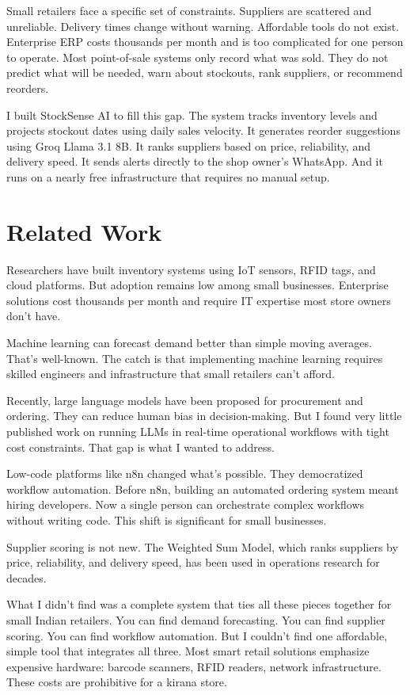 \documentclass[journal]{IEEEtran}
\begin{document}
Small retailers face a specific set of constraints. Suppliers are scattered and unreliable. Delivery times change without warning. Affordable tools do not exist. Enterprise ERP costs thousands per month and is too complicated for one person to operate. Most point-of-sale systems only record what was sold. They do not predict what will be needed, warn about stockouts, rank suppliers, or recommend reorders.

I built StockSense AI to fill this gap. The system tracks inventory levels and projects stockout dates using daily sales velocity. It generates reorder suggestions using Groq Llama 3.1 8B. It ranks suppliers based on price, reliability, and delivery speed. It sends alerts directly to the shop owner's WhatsApp. And it runs on a nearly free infrastructure that requires no manual setup.

\section{Related Work}

Researchers have built inventory systems using IoT sensors, RFID tags, and cloud platforms. But adoption remains low among small businesses. Enterprise solutions cost thousands per month and require IT expertise most store owners don't have.

Machine learning can forecast demand better than simple moving averages. That's well-known. The catch is that implementing machine learning requires skilled engineers and infrastructure that small retailers can't afford.

Recently, large language models have been proposed for procurement and ordering. They can reduce human bias in decision-making. But I found very little published work on running LLMs in real-time operational workflows with tight cost constraints. That gap is what I wanted to address.

Low-code platforms like n8n changed what's possible. They democratized workflow automation. Before n8n, building an automated ordering system meant hiring developers. Now a single person can orchestrate complex workflows without writing code. This shift is significant for small businesses.

Supplier scoring is not new. The Weighted Sum Model, which ranks suppliers by price, reliability, and delivery speed, has been used in operations research for decades.

What I didn't find was a complete system that ties all these pieces together for small Indian retailers. You can find demand forecasting. You can find supplier scoring. You can find workflow automation. But I couldn't find one affordable, simple tool that integrates all three. Most smart retail solutions emphasize expensive hardware: barcode scanners, RFID readers, network infrastructure. These costs are prohibitive for a kirana store.
\end{document}
